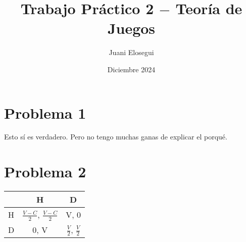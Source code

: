 \documentclass{article}
\title{Trabajo Práctico 2 $-$ Teoría de Juegos}
\author{Juani Elosegui}
\date{Diciembre 2024}
\begin{document}
    \maketitle
    
    \section*{Problema 1}
        Esto sí es verdadero. Pero no tengo muchas ganas de explicar el porqué.
    \section*{Problema 2}
        \begin{table}[H]
            \begin{tabular}{|c|c|c|}
                \hline
                    & H & D \\ \hline
                H   & $\frac{V-C}{2}$, $\frac{V-C}{2}$ & V, 0 \\ 
                D   & 0, V & $\frac{V}{2}$, $\frac{V}{2}$ \\ \hline
            \end{tabular}
        \end{table}
\end{document}
